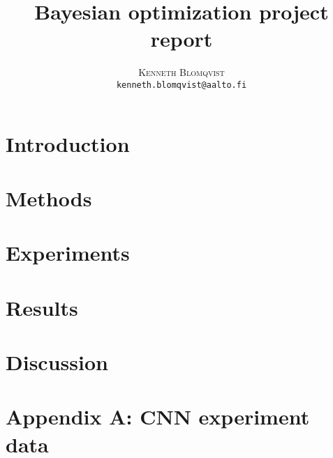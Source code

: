 \documentclass[twoside]{article}
\title{\vspace{-15mm}\fontsize{24pt}{10pt}\textbf{Bayesian optimization project report}}
\author{
  \large
  \textsc{Kenneth Blomqvist}\\[2mm]
  \texttt{kenneth.blomqvist@aalto.fi}\\[2mm]
}
\date{}
\begin{document}
\maketitle %


\begin{abstract}
  
\end{abstract}


\begin{multicols}{2} %

  \section{Introduction}
  \label{sec:introduction}
  

  \section{Methods}
  \label{sec:methods}
  

  \section{Experiments}
  \label{sec:experiments}
  

  \section{Results}
  \label{sec:results}
  

  \section{Discussion}
  \label{sec:discussion}
  



  
  

\end{multicols} %
\pagebreak

\section{Appendix A: CNN experiment data}


\end{document}
